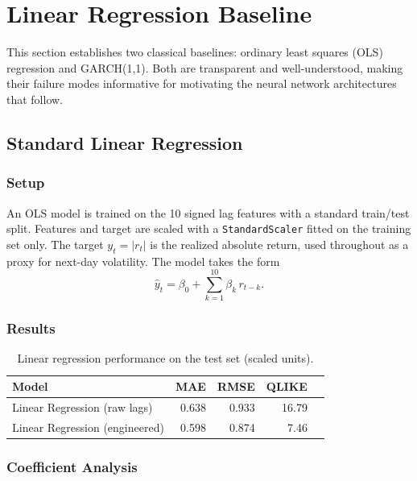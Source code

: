 \section{Linear Regression Baseline}
\label{sec:linreg}

This section establishes two classical baselines: ordinary least squares (OLS) regression
and GARCH(1,1). Both are transparent and well-understood, making their failure modes
informative for motivating the neural network architectures that follow.

\subsection{Standard Linear Regression}

\subsubsection{Setup}

An OLS model is trained on the 10 signed lag features with a standard train/test split.
Features and target are scaled with a \texttt{StandardScaler} fitted on the training set
only. The target $y_t = |r_t|$ is the realized absolute return, used throughout as a
proxy for next-day volatility. The model takes the form
\[
  \hat{y}_t = \beta_0 + \sum_{k=1}^{10} \beta_k \, r_{t-k}.
\]

\subsubsection{Results}

\begin{table}[H]
  \centering
  \caption{Linear regression performance on the test set (scaled units).}
  \label{tab:linreg_full}
  \begin{tabular}{lrrrr}
    \toprule
    Model & MAE & RMSE & QLIKE \\
    \midrule
    Linear Regression (raw lags)     & 0.638 & 0.933 & 16.79 \\
    Linear Regression (engineered)   & 0.598 & 0.874 &  7.46 \\
    \bottomrule
  \end{tabular}
\end{table}

\subsubsection{Coefficient Analysis}

